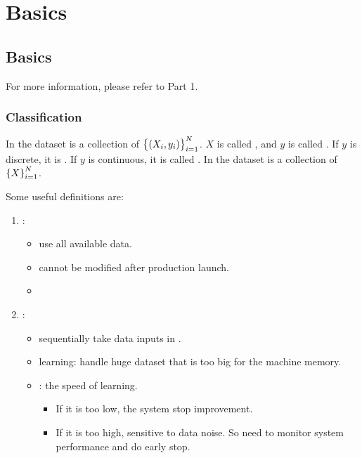 \chapter{Basics}

\section{Basics}

For more information, please refer to \cite{AurelienGeron2019} Part 1.

\subsection{Classification}

In  the dataset is a collection of $\set{(X_i, y_i)}_{i=1}^N$. $X$ is called , and $y$ is called . If $y$ is discrete, it is . If $y$ is continuous, it is called . In  the dataset is a collection of $\set{X}_{i=1}^N$.

Some useful definitions are:
\begin{enumerate}
    \item {}: 
        \begin{itemize}
            \item use all available data.
            \item cannot be modified after production launch.
            \item {}
        \end{itemize}
    \item {}:
        \begin{itemize}
            \item sequentially take data inputs in .
            \item {} learning: handle huge dataset that is too big for the machine memory.
            \item {}: the speed of learning.
                \begin{itemize}
                    \item If it is too low, the system stop improvement.
                    \item If it is too high, sensitive to data noise. So need to monitor system performance and do early stop.
                \end{itemize}
        \end{itemize}
\end{enumerate}

